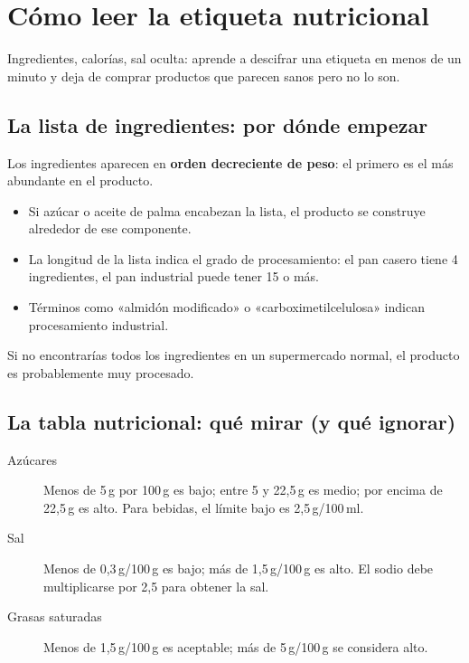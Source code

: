 \documentclass[a5paper,12pt,oneside,openany]{book}
\newcommand{\boxinfo}[2]{%
  \begin{tcolorbox}[cajabase,
    colback=azulinfo!8!white, colframe=azulinfo, title={#1}]
  #2\end{tcolorbox}}
\begin{document}
\chapter{Cómo leer la etiqueta nutricional}

Ingredientes, calorías, sal oculta: aprende a descifrar una etiqueta en menos de
un minuto y deja de comprar productos que parecen sanos pero no lo son.

\section{La lista de ingredientes: por dónde empezar}

Los ingredientes aparecen en \textbf{orden decreciente de peso}: el primero es el
más abundante en el producto.

\begin{itemize}
  \item Si azúcar o aceite de palma encabezan la lista, el producto se construye
    alrededor de ese componente.
  \item La longitud de la lista indica el grado de procesamiento: el pan casero
    tiene 4 ingredientes, el pan industrial puede tener 15 o más.
  \item Términos como «almidón modificado» o «carboximetilcelulosa» indican
    procesamiento industrial.
\end{itemize}

\boxinfo{Regla práctica}{Si no encontrarías todos los ingredientes en un
supermercado normal, el producto es probablemente muy procesado.}

\section{La tabla nutricional: qué mirar (y qué ignorar)}

\begin{description}
  \item[Azúcares] Menos de 5\,g por 100\,g es bajo; entre 5 y 22,5\,g es medio;
    por encima de 22,5\,g es alto. Para bebidas, el límite bajo es 2,5\,g/100\,ml.
  \item[Sal] Menos de 0,3\,g/100\,g es bajo; más de 1,5\,g/100\,g es alto.
    El sodio debe multiplicarse por 2,5 para obtener la sal.
  \item[Grasas saturadas] Menos de 1,5\,g/100\,g es aceptable; más de 5\,g/100\,g
    se considera alto.
\end{description}
\end{document}
